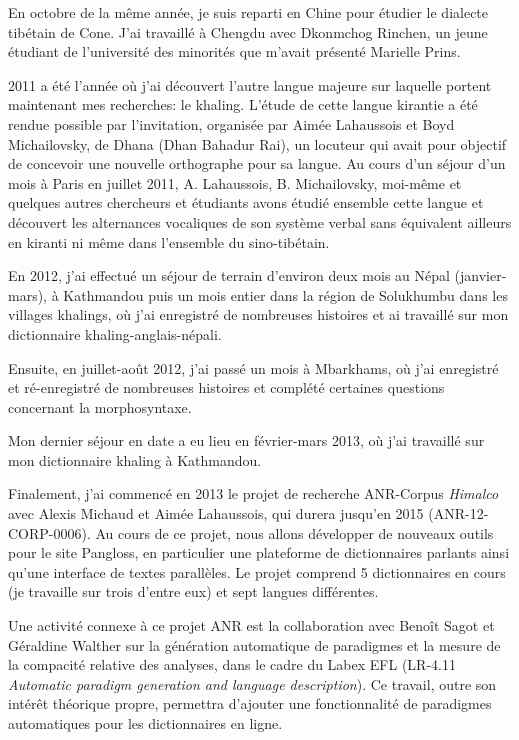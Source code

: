 \documentclass[oldfontcommands,oneside,a4paper,11pt]{memoir}
\begin{document}
En octobre de la même année, je suis reparti en Chine pour étudier le dialecte tibétain de Cone. J'ai travaillé à Chengdu avec Dkonmchog Rinchen, un jeune étudiant de l'université des minorités que m'avait présenté Marielle Prins.

2011 a   été l'année où j'ai découvert l'autre langue majeure sur laquelle portent maintenant mes recherches: le khaling. L'étude de cette langue kirantie a été rendue possible par l'invitation, organisée par Aimée Lahaussois et Boyd Michailovsky, de Dhana (Dhan Bahadur Rai), un locuteur qui avait pour objectif de concevoir une nouvelle orthographe pour sa langue. Au cours d'un séjour d'un mois à Paris en juillet 2011, A. Lahaussois, B. Michailovsky, moi-même et quelques autres chercheurs et étudiants avons étudié ensemble cette langue et découvert les alternances vocaliques de son système verbal sans équivalent ailleurs en kiranti ni même dans l'ensemble du sino-tibétain.


En 2012, j'ai effectué un séjour de terrain d'environ deux mois au Népal (janvier-mars), à Kathmandou puis un mois entier dans la région de Solukhumbu dans les villages khalings, où j'ai enregistré de nombreuses histoires et ai travaillé sur mon dictionnaire khaling-anglais-népali.  

Ensuite, en juillet-août 2012, j'ai passé un mois à Mbarkhams, où j'ai enregistré et ré-enregistré de nombreuses histoires et complété certaines questions concernant la morphosyntaxe.

Mon dernier séjour en date a eu lieu en février-mars 2013, où j'ai travaillé sur mon dictionnaire khaling à Kathmandou. 

Finalement, j'ai commencé en 2013 le projet de recherche ANR-Corpus \textit{Himalco} avec Alexis Michaud et Aimée Lahaussois, qui durera jusqu'en 2015 (ANR-12-CORP-0006). Au cours de ce projet, nous allons développer de nouveaux outils pour le site Pangloss, en particulier une plateforme de dictionnaires parlants ainsi qu'une interface de textes parallèles. Le projet comprend 5 dictionnaires en cours (je travaille sur trois d'entre eux) et sept langues différentes.

Une activité connexe à ce projet ANR est la collaboration avec Benoît Sagot et Géraldine Walther sur la génération automatique de paradigmes et la mesure de la compacité relative des analyses, dans le cadre du Labex EFL (LR-4.11 \textit{Automatic paradigm generation and language description}). Ce travail, outre son intérêt théorique propre, permettra d'ajouter une fonctionnalité de paradigmes automatiques pour les dictionnaires en ligne.
 
\end{document}
